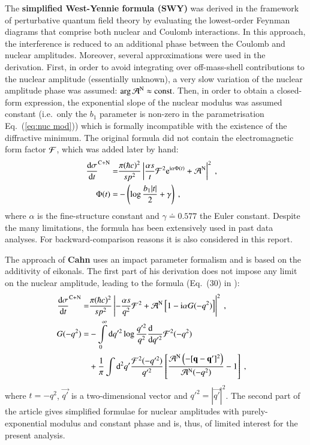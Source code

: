 The {\bf simplified West-Yennie formula (SWY)} \cite{wy68} was derived in the framework of perturbative quantum field theory by evaluating the lowest-order Feynman diagrams that comprise both nuclear and Coulomb interactions. In this approach, the interference is reduced to an additional phase between the Coulomb and nuclear amplitudes. Moreover, several approximations were used in the derivation. First, in order to avoid integrating over off-mass-shell contributions to the nuclear amplitude (essentially unknown), a very slow variation of the nuclear amplitude phase was assumed: $\arg {\cal A}^{\rm N} \approx \hbox{const}$. Then, in order to obtain a closed-form expression, the exponential slope of the nuclear modulus was assumed constant (i.e.~only the $b_1$ parameter is non-zero in the parametrisation Eq.~(\ref{eq:nuc mod})) which is formally incompatible with the existence of the diffractive minimum. The original formula did not contain the electromagnetic form factor ${\cal F}$, which was added later by hand:
\begin{equation}
\label{eq:int swy}
	\begin{aligned}
		{\d\sigma\over \d t}^{\rm C+N} =& {\pi (\hbar c)^2 \over s p^2} \left | {\alpha s\over t} {\cal F}^2 \e^{\I\alpha \Phi(t)} + {\cal A}^{\rm N}
			\right |^2\ ,\cr
		\Phi(t) =& - \left( \log {b_1 |t|\over 2} + \gamma \right)\ ,\cr
	\end{aligned}
\end{equation}
where $\alpha$ is the fine-structure constant and $\gamma \doteq 0.577$ the Euler constant. Despite the many limitations, the formula has been extensively used in past data analyses. For backward-comparison reasons it is also considered in this report.

The approach of {\bf Cahn} \cite{cahn82} uses an impact parameter formalism and is based on the additivity of eikonals. The first part of his derivation does not impose any limit on the nuclear amplitude, leading to the formula (Eq.~(30) in \cite{cahn82}):
\begin{equation}
\label{eq:int cahn}
	\begin{aligned}
		{\d\sigma\over \d t}^{\rm C+N} =& {\pi (\hbar c)^2 \over s p^2} \left | -{\alpha s\over q^2} {\cal F}^2
			+ {\cal A}^{\rm N}\, \Big[1 - \I\alpha G(-q^2)\Big] \right |^2\ ,\cr
		G(-q^2) =& - \int\limits_0^\infty \d q'^2 \log {q'^2\over q^2} {\d\phantom{q'^2}\over \d q'^2} {\cal F}^2(-q^2)\cr
				&+ {1\over\pi} \int\d^2 q' {{\cal F}^2(-q'^2)\over q'^2} \left[ {{\cal A}^{\rm N}\left(-[\vec{q} - \vec{q'}]^2\right) \over
					{\cal A}^{\rm N}(-q^2)} - 1 \right]\ , \cr
	\end{aligned}
\end{equation}
where $t=-q^2$, $\vec{q'}$ is a two-dimensional vector and $q'^2 = |\vec{q'}|^2$. The second part of the article gives simplified formulae for nuclear amplitudes with purely-exponential modulus and constant phase and is, thus, of limited interest for the present analysis.

